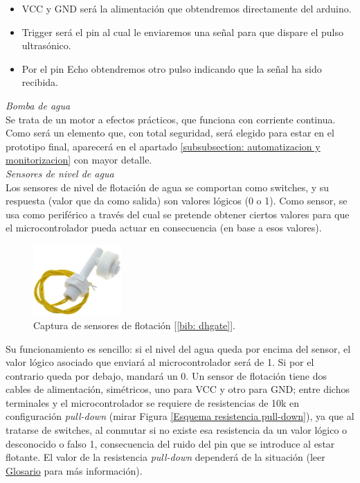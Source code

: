 \documentclass[12pt]{article}
\begin{document}
	\begin{itemize}
		\item VCC y GND será la alimentación que obtendremos directamente del arduino. 
		\item Trigger será el pin al cual le enviaremos una señal para que dispare el pulso ultrasónico. 
		\item Por el pin Echo obtendremos otro pulso indicando que la señal ha sido recibida.
	\end{itemize}
	
	\noindent \textit{Bomba de agua} \\
	
	\noindent Se trata de un motor a efectos prácticos, que funciona con corriente continua. Como será un elemento que, con total seguridad, será elegido para estar en el prototipo final, aparecerá en el apartado \ref{subsubsection: automatizacion y monitorizacion} con mayor detalle. \\
	
	\noindent \textit{Sensores de nivel de agua} \\
	
	\noindent Los sensores de nivel de flotación de agua se comportan como switches, y su respuesta (valor que da como salida) son valores lógicos (0 o 1). Como sensor, se usa como periférico a través del cual se pretende obtener ciertos valores para que el microcontrolador pueda actuar en consecuencia (en base a esos valores).\\
	
	\begin{figure}[h!]
			\begin{center}
				\includegraphics[width=0.3\textwidth]{img/sensor_flotacion.png}
				\caption{Captura de sensores de flotación [\ref{bib: dhgate}].}
				\label{Sensor de flotación}
			\end{center}
	\end{figure}
	
	
	\noindent Su funcionamiento es sencillo: si el nivel del agua queda por encima del sensor, el valor lógico asociado que enviará al microcontrolador será de 1. Si por el contrario queda por debajo, mandará un 0. Un sensor de flotación tiene dos cables de alimentación, simétricos, uno para VCC y otro para GND; entre dichos terminales y el microcontrolador se requiere de resistencias de 10k en configuración \textit{pull-down} (mirar Figura \ref{Esquema resistencia pull-down}), ya que al tratarse de switches, al conmutar si no existe esa resistencia da un valor lógico o desconocido o falso 1, consecuencia del ruido del pin que se introduce al estar flotante. El valor de la resistencia \textit{pull-down} dependerá de la situación (leer \hyperref[glosario]{Glosario} para más información).\\
	
\end{document}
